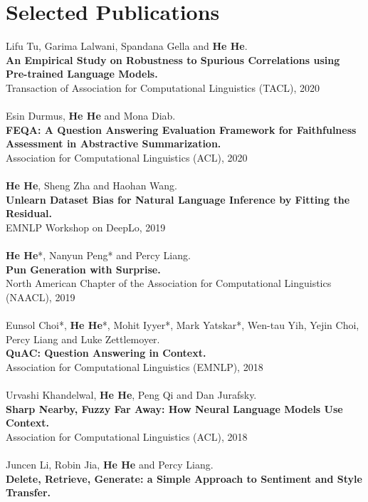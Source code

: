 \documentclass[a4paper,11pt]{article}
\begin{document}
\section{Selected Publications}
\vspace{1ex}
Lifu Tu, Garima Lalwani, Spandana Gella and {\bf He He}.\\
{\bf An Empirical Study on Robustness to Spurious Correlations using Pre-trained Language Models.}\\
Transaction of Association for Computational Linguistics (TACL), 2020\\
\\
Esin Durmus, {\bf He He} and Mona Diab.\\
{\bf FEQA: A Question Answering Evaluation Framework for Faithfulness Assessment in Abstractive Summarization.}\\
Association for Computational Linguistics (ACL), 2020\\
\\
{\bf He He}, Sheng Zha and Haohan Wang.\\
{\bf Unlearn Dataset Bias for Natural Language Inference by Fitting the Residual.}\\
EMNLP Workshop on DeepLo, 2019\\
\\
{\bf He He}*, Nanyun Peng* and Percy Liang. \\
{\bf Pun Generation with Surprise.}\\
North American Chapter of the Association for Computational Linguistics (NAACL), 2019 \\
\\
Eunsol Choi*, {\bf He He}*, Mohit Iyyer*, Mark Yatskar*, Wen-tau Yih, Yejin Choi, Percy Liang and Luke Zettlemoyer.\\
{\bf QuAC: Question Answering in Context.}\\
Association for Computational Linguistics (EMNLP), 2018\\
\\
Urvashi Khandelwal, {\bf He He}, Peng Qi and Dan Jurafsky.\\
{\bf Sharp Nearby, Fuzzy Far Away: How Neural Language Models Use Context.}\\
Association for Computational Linguistics (ACL), 2018\\
\\
Juncen Li, Robin Jia, {\bf He He} and Percy Liang.\\
{\bf Delete, Retrieve, Generate: a Simple Approach to Sentiment and Style Transfer.}\\
\end{document}
